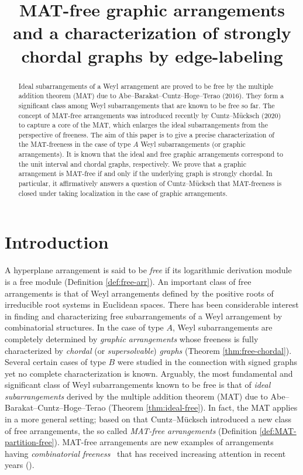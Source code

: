 \documentclass[ALCO, Unicode,published]{cedram}
\title
[MAT-free graphic arrangements and strongly chordal graphs]
{MAT-free graphic arrangements and a characterization of strongly chordal graphs by edge-labeling}
\author[\initial{T.} \middlename{N.} Tran]{\firstname{Tan} \middlename{N.} \lastname{Tran}}
\author[\initial{S.} Tsujie]{\firstname{Shuhei}  \lastname{Tsujie}}
\begin{document}
\newtheorem{claim}[cdrthm]{Claim}


\begin{abstract}
Ideal subarrangements of a Weyl arrangement are proved to be free by the multiple addition theorem (MAT) due to Abe--Barakat--Cuntz--Hoge--Terao (2016). 
They form a significant class among Weyl subarrangements that are known to be free so far.
The concept of MAT-free arrangements was introduced recently by Cuntz--M{\"u}cksch (2020) to capture a core of the MAT, which enlarges the ideal subarrangements from the perspective of freeness. 
The aim of this paper is to give a precise characterization of the MAT-freeness in the case of type $A$ Weyl subarrangements (or graphic arrangements).
It is known that  the ideal and free graphic arrangements correspond to the unit interval and chordal graphs, respectively. 
We prove that a graphic arrangement is MAT-free if and only if the underlying graph is strongly chordal. 
In particular, it affirmatively answers a question of Cuntz--M{\"u}cksch that MAT-freeness is closed under taking localization in the case of graphic arrangements.
\end{abstract}


\maketitle


\section{Introduction}
\label{sec:intro}
 \quad
A hyperplane arrangement is said to be  \emph{free} if its logarithmic derivation module is a free module \cite{T80, OT92} (\cf Definition \ref{def:free-arr}). 
An important class of  free arrangements is that of Weyl arrangements defined by the positive roots of irreducible root systems in Euclidean spaces. 
There has been considerable interest  in finding and  characterizing  free subarrangements of a Weyl arrangement by combinatorial structures. 
In the case of type $A$, Weyl subarrangements are completely determined by \emph{graphic arrangements} whose freeness is fully characterized by \emph{chordal}  (or  \emph{supersolvable})  \emph{graphs} \cite{St72, ER94} (\cf Theorem \ref{thm:free-chordal}). 
Several certain cases of  type $B$  were studied in the connection with signed graphs \cite{ER94, STT19, TT20} yet no complete characterization is known. 
Arguably, the most fundamental and significant class of Weyl subarrangements known to be free is that of \emph{ideal subarrangements} derived by the  multiple addition theorem (MAT) due to Abe--Barakat--Cuntz--Hoge--Terao \cite{ABCHT16} (\cf Theorem \ref{thm:ideal-free}). 
In fact, the MAT applies in a more general setting; based on that Cuntz--M{\"u}cksch  \cite{CM20} introduced a new class of free arrangements, the so called \emph{MAT-free arrangements}  (\cf Definition \ref{def:MAT-partition-free}). 
MAT-free arrangements are new examples of arrangements having \emph{combinatorial freeness}~\cite[Lemma 18]{CM20} that has received increasing attention in recent years (\eg  \cite{AT19, MR21}).
 
\end{document}
